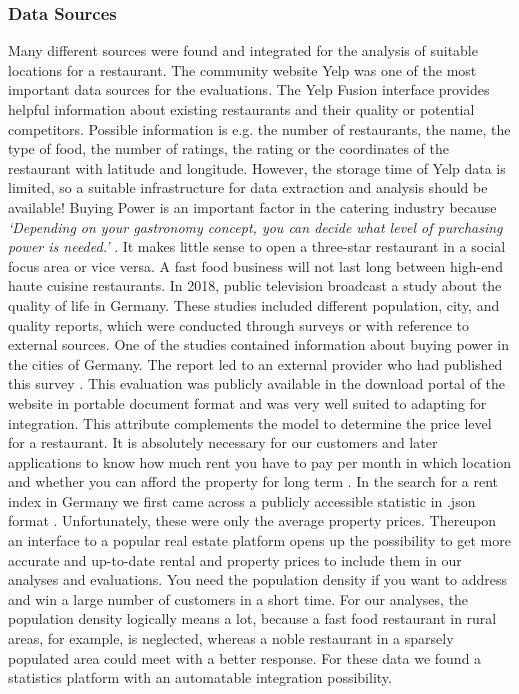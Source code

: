 \subsubsection{Data Sources}
\label{subsubsec:sources}
Many different sources were found and integrated for the analysis of suitable locations for a restaurant. The community website Yelp was one of the most important data sources for the evaluations. The Yelp Fusion interface provides helpful information about existing restaurants and their quality or potential competitors.  Possible information is e.g. the number of restaurants, the name, the type of food, the number of ratings, the rating or the coordinates of the restaurant with latitude and longitude.  However, the storage time of Yelp data is limited, so a suitable infrastructure for data extraction and analysis should be available!
\newline
Buying Power is an important factor in the catering industry because \textit{`Depending on your gastronomy concept, you can decide what level of purchasing power is needed.'} \cite{locana}. It makes little sense to open a three-star restaurant in a social focus area or vice versa. A fast food business will not last long between high-end haute cuisine restaurants. In 2018, public television broadcast a study about the quality of life in Germany. These studies included different population, city, and quality reports, which were conducted through surveys or with reference to external sources. One of the studies contained information about buying power in the cities of Germany. The report led to an external provider who had published this survey \cite{buyingpower}. This evaluation was publicly available in the download portal of the website in portable document format and was very well suited to adapting for integration. This attribute complements the model to determine the price level for a restaurant.
\newline
It is absolutely necessary for our customers and later applications to know how much rent you have to pay per month in which location and whether you can afford the property for long term \cite{locana}. In the search for a rent index in Germany we first came across a publicly accessible statistic in .json format \cite{Sparda}. Unfortunately, these were only the average property prices. Thereupon an interface to a popular real estate platform \cite{ImmoScout} opens up the possibility to get more accurate and up-to-date rental and property prices to include them in our analyses and evaluations.
\newline
You need the population density if you want to address and win a large number of customers in a short time. For our analyses, the population density logically means a lot, because a fast food restaurant in rural areas, for example, is neglected, whereas a noble restaurant in a sparsely populated area could meet with a better response. For these data we found a statistics platform with an automatable integration possibility.\cite{destatis}

